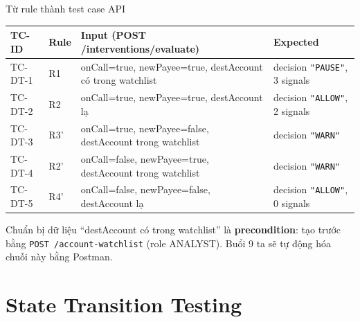 \documentclass[aspectratio=169,12pt]{beamer}
\begin{document}
\begin{frame}[shrink=10]{Từ rule thành test case API}
  \begin{center}
  \small
  \setlength{\tabcolsep}{4pt}
  \renewcommand{\arraystretch}{0.95}
  \begin{tabularx}{\textwidth}{l l >{\raggedright\arraybackslash}X l}
    \toprule
    \textbf{TC-ID} & \textbf{Rule} & \textbf{Input (POST /interventions/evaluate)} & \textbf{Expected} \\
    \midrule
    TC-DT-1 & R1 & onCall=true, newPayee=true, destAccount có trong watchlist & decision \texttt{"PAUSE"}, 3 signals \\
    TC-DT-2 & R2 & onCall=true, newPayee=true, destAccount lạ & decision \texttt{"ALLOW"}, 2 signals \\
    TC-DT-3 & R3' & onCall=true, newPayee=false, destAccount trong watchlist & decision \texttt{"WARN"} \\
    TC-DT-4 & R2' & onCall=false, newPayee=true, destAccount trong watchlist & decision \texttt{"WARN"} \\
    TC-DT-5 & R4' & onCall=false, newPayee=false, destAccount lạ & decision \texttt{"ALLOW"}, 0 signals \\
    \bottomrule
  \end{tabularx}
  \renewcommand{\arraystretch}{1}
  \end{center}

  \vspace{0.2em}
  \begin{exampleblock}{Chuẩn bị dữ liệu}
    \small ``destAccount có trong watchlist'' là \textbf{precondition}:
    tạo trước bằng \texttt{POST /account-watchlist} (role ANALYST).
    Buổi 9 ta sẽ tự động hóa chuỗi này bằng Postman.
  \end{exampleblock}
\end{frame}

\section{State Transition Testing}
\end{document}
